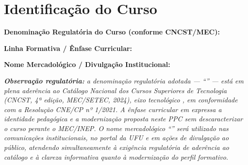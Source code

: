 \chapter{Identificação do Curso}
\label{chp:identificacao}


\begin{center}
\parbox{0.8\textwidth}{\textbf{Denominação Regulatória do Curso (conforme CNCST/MEC):} \ppccurso\footnotemark}

\parbox{0.8\textwidth}{\textbf{Linha Formativa / Ênfase Curricular:} \ppcenfasecurricular}

\parbox{0.8\textwidth}{\textbf{Nome Mercadológico / Divulgação Institucional:} \ppccursomercadologico\footnotemark}

\parbox{0.8\textwidth}{\textit{\textbf{Observação regulatória:} a denominação regulatória adotada — ``\ppccurso'' — está em plena aderência ao Catálogo Nacional dos Cursos Superiores de Tecnologia (CNCST, 4ª edição, MEC/SETEC, 2024), eixo tecnológico \ppceixotecnologico, em conformidade com a Resolução CNE/CP nº 1/2021. A ênfase curricular em \ppcenfasecurricular expressa a identidade pedagógica e a modernização proposta neste PPC sem descaracterizar o curso perante o MEC/INEP. O nome mercadológico ``\ppccursomercadologico'' será utilizado nas comunicações institucionais, no portal da UFU e em ações de divulgação ao público, atendendo simultaneamente à exigência regulatória de aderência ao catálogo e à clareza informativa quanto à modernização do perfil formativo.}}


\end{center}
